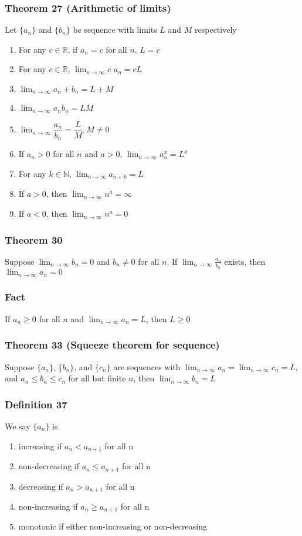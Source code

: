 \documentclass[12pt, letterpaper]{article}
\begin{document}
\subsubsection*{Theorem 27 (Arithmetic of limits)}
Let $\{a_n\}$ and $\{b_n\}$ be sequence with limits $L$ and $M$ respectively
\begin{enumerate}
    \item For any $c \in \mathbb{R}$, if $a_n = c$ for all $n$, $L = c$
    \item For any $c \in \mathbb{R}$, $\displaystyle\lim_{n\to\infty} c$ $a_n = cL$
    \item $\displaystyle\lim_{n\to\infty} a_n + b_n = L + M$
    \item $\displaystyle\lim_{n\to\infty} a_n b_n = LM$
    \item $\displaystyle\lim_{n\to\infty} \dfrac{a_n}{b_n} = \dfrac{L}{M}, M\neq 0$
    \item If $a_n > 0$ for all $n$ and $a > 0$, $\displaystyle\lim_{n\to\infty} a_n^x = L^x$
    \item For any $k \in \mathbb{N}$, $\displaystyle\lim_{n\to\infty} a_{n+k} = L$
    \item If $a > 0$, then $\displaystyle\lim_{n\to\infty} n^a = \infty$
    \item If $a < 0$, then $\displaystyle\lim_{n\to\infty} n^a = 0$
\end{enumerate}
\subsubsection*{Theorem 30}
Suppose $\displaystyle\lim_{n\to\infty} b_n = 0$ and $b_n \neq 0$ for all $n$. If 
$\displaystyle\lim_{n\to\infty} \frac{a_n}{b_n}$ exists, then $\displaystyle\lim_{n\to\infty} a_n = 0$
\subsubsection*{Fact}
If $a_n \geq 0$ for all $n$ and $\displaystyle\lim_{n\to\infty} a_n = L$, then $L \geq 0$
\subsubsection*{Theorem 33 (Squeeze theorem for sequence)}
Suppose $\{a_n\}$, $\{b_n\}$, and $\{c_n\}$ are sequences with $\displaystyle\lim_{n\to\infty} a_n = \displaystyle\lim_{n\to\infty} c_n = L$, and 
$a_n \leq b_n \leq c_n$ for all but finite $n$, then $\displaystyle\lim_{n\to\infty} b_n = L$
\subsubsection*{Definition 37}
We say $\{a_n\}$ is 
\begin{enumerate}
    \item increasing if $a_n < a_{n+1}$ for all n
    \item non-decreasing if $a_n \leq a_{n+1}$ for all n
    \item decreasing if $a_n > a_{n+1}$ for all n
    \item non-increasing if $a_n \geq a_{n+1}$ for all n
    \item monotonic if either non-increasing or non-decreasing
\end{enumerate}
\end{document}
